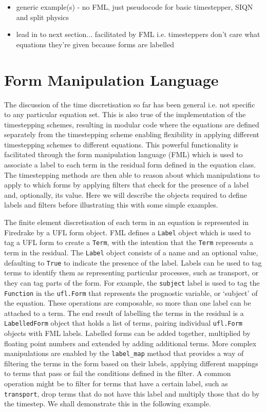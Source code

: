 \documentclass[journal abbreviation, manuscript]{copernicus}
\begin{document}
\begin{itemize}
\item generic example(s) - no FML, just pseudocode for basic
  timestepper, SIQN and split physics
\item lead in to next section... facilitated by FML i.e. timesteppers don't care what equations they're given because forms are labelled
\end{itemize}

\section{Form Manipulation Language}
\label{sec: FML}
The discussion of the time discretisation so far has been general i.e.
not specific to any particular equation set. This is also true of the
implementation of the timestepping schemes, resulting in modular code
where the equations are defined separately from the timestepping
scheme enabling flexibility in applying different timestepping schemes
to different equations. This powerful functionality is facilitated
through the form manipulation language (FML) which is used to
associate a label to each term in the residual form defined in the
equation class. The timestepping methods are then able to reason about
which manipulations to apply to which forms by applying filters that
check for the presence of a label and, optionally, its value. Here we
will describe the objects required to define labels and filters before
illustrating this with some simple examples.

The finite element discretisation of each term in an equation is
represented in Firedrake by a UFL form object. FML defines a
\texttt{Label} object which is used to tag a UFL form to create a
\texttt{Term}, with the intention that the \texttt{Term} represents a
term in the residual. The \texttt{Label} object consists of a name and
an optional value, defaulting to \texttt{True} to indicate the
presence of the label. Labels can be used to tag terms to identify
them as representing particular processes, such as transport, or they
can tag parts of the form. For example, the \texttt{subject} label is
used to tag the \texttt{Function} in the \texttt{ufl.Form} that
represents the prognostic variable, or `subject' of the
equation. These operations are composable, so more than one label can
be attached to a term. The end result of labelling the terms in the
residual is a \texttt{LabelledForm} object that holds a list of terms,
pairing individual \texttt{ufl.Form} objects with FML labels. Labelled
forms can be added together, multiplied by floating point numbers and
extended by adding additional terms. More complex manipulations are
enabled by the \texttt{label\_map} method that provides a way of
filtering the terms in the form based on their labels, applying
different mappings to terms that pass or fail the conditions defined
in the filter. A common operation might be to filter for terms that
have a certain label, such as \texttt{transport}, drop terms that do
not have this label and multiply those that do by the timestep. We
shall demonstrate this in the following example.
\end{document}
